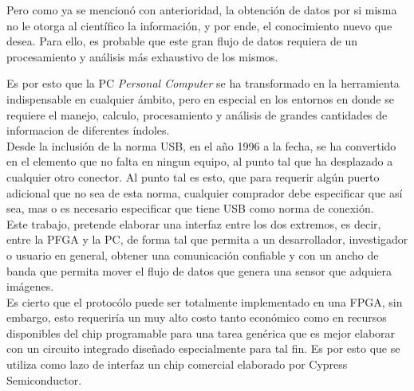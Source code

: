 Pero como ya se mencionó con anterioridad, la obtención de datos por si misma no le otorga al científico la información, y por ende, el conocimiento nuevo que desea. Para ello, es probable que este gran flujo de datos requiera de un procesamiento y análisis más exhaustivo de los mismos.

Es por esto que la PC {\it Personal Computer} se ha transformado en la herramienta indispensable en cualquier ámbito, pero en especial en los entornos en donde se requiere el  manejo, calculo, procesamiento y análisis de grandes cantidades de informacion de diferentes índoles.\\

Desde la inclusión de la norma USB, en el año 1996 a la fecha, se ha convertido en el elemento que no falta en ningun equipo, al punto tal que ha desplazado a cualquier otro conector. Al punto tal es esto, que para requerir algún puerto adicional que no sea de esta norma, cualquier comprador debe especificar que así sea, mas o es necesario especificar que tiene USB como norma de conexión.\\

Este trabajo, pretende elaborar una interfaz entre los dos extremos, es decir, entre la PFGA y la PC, de forma tal que permita a un desarrollador, investigador o usuario en general, obtener una comunicación confiable y con un ancho de banda que permita mover el flujo de datos que genera una sensor que adquiera imágenes.\\

Es cierto que el protocólo puede ser totalmente implementado en una FPGA, sin embargo, esto requeriría un muy alto costo tanto económico como en recursos disponibles del chip programable para una tarea genérica que es mejor elaborar con un circuito integrado diseñado especialmente para tal fin. Es por esto que se utiliza como lazo de interfaz un chip comercial elaborado por Cypress Semiconductor.\\







